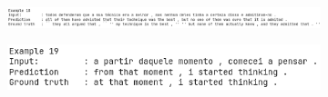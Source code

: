 \documentclass[12pt, a4paper]{book}
\begin{document}
\begin{figure}[h]
\begin{subfigure}{\linewidth}
\begin{flushright}
        \end{flushright}
    \end{subfigure}
    \break
    \begin{subfigure}{\linewidth}
        \begin{flushright}
        \includegraphics[width=\linewidth]{images/examples/19.png}
        \end{flushright}
    \end{subfigure}
    \break
    \begin{subfigure}{\linewidth}
        \begin{flushright}
        \includegraphics[width=\linewidth]{images/examples/20.png}
        \end{flushright}
    \end{subfigure}
    \break
\end{figure}
\end{document}
